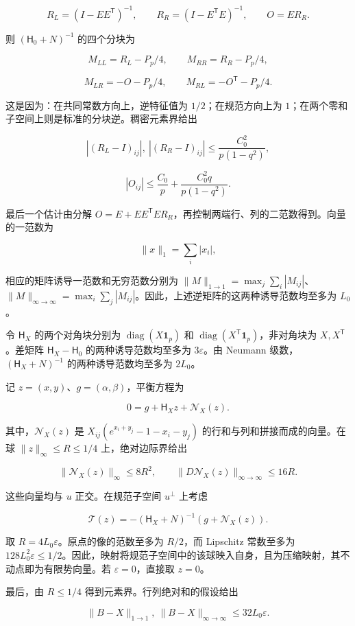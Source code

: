 \documentclass[11pt,a4paper]{article}
\begin{document}
\[
R_L=(I-EE^{\mathsf T})^{-1},\qquad R_R=(I-E^{\mathsf T}E)^{-1},\qquad O=ER_R.
\]

则 \((\mathsf H_0+N)^{-1}\) 的四个分块为

\[
M_{LL}=R_L-P_p/4,\qquad M_{RR}=R_R-P_p/4,
\]

\[
M_{LR}=-O-P_p/4,\qquad M_{RL}=-O^{\mathsf T}-P_p/4.
\]

这是因为：在共同常数方向上，逆特征值为 \(1/2\)；在规范方向上为 \(1\)；在两个零和子空间上则是标准的分块逆。稠密元素界给出

\[
|(R_L-I)_{ij}|,\ |(R_R-I)_{ij}|\le\frac{C_0^2}{p(1-q^2)},
\]

\[
|O_{ij}|\le\frac{C_0}{p}+\frac{C_0^2q}{p(1-q^2)}.
\]

最后一个估计由分解 \(O=E+EE^{\mathsf T}ER_R\)，再控制两端行、列的二范数得到。向量的一范数为

\[
\|x\|_1=\sum_i|x_i|,
\]

相应的矩阵诱导一范数和无穷范数分别为 \(\|M\|_{1\to1}=\max_j\sum_i|M_{ij}|\)、\(\|M\|_{\infty\to\infty}=\max_i\sum_j|M_{ij}|\)。因此，上述逆矩阵的这两种诱导范数均至多为 \(L_0\)。

令 \(\mathsf H_X\) 的两个对角块分别为 \(\operatorname{diag}(X\mathbf 1_p)\) 和 \(\operatorname{diag}(X^{\mathsf T}\mathbf 1_p)\)，非对角块为 \(X,X^{\mathsf T}\)。差矩阵 \(\mathsf H_X-\mathsf H_0\) 的两种诱导范数均至多为 \(3\varepsilon\)。由 Neumann 级数，\((\mathsf H_X+N)^{-1}\) 的两种诱导范数均至多为 \(2L_0\)。

记 \(z=(x,y)\)、\(g=(\alpha,\beta)\)，平衡方程为

\[
0=g+\mathsf H_Xz+\mathcal N_X(z).
\]

其中，\(\mathcal N_X(z)\) 是 \(X_{ij}(e^{x_i+y_j}-1-x_i-y_j)\) 的行和与列和拼接而成的向量。在球 \(\|z\|_\infty\le R\le1/4\) 上，绝对边际界给出

\[
\|\mathcal N_X(z)\|_\infty\le8R^2,\qquad \|D\mathcal N_X(z)\|_{\infty\to\infty}\le16R.
\]

这些向量均与 \(u\) 正交。在规范子空间 \(u^\perp\) 上考虑

\[
\mathcal T(z)=-(\mathsf H_X+N)^{-1}(g+\mathcal N_X(z)).
\]

取 \(R=4L_0\varepsilon\)。原点的像的范数至多为 \(R/2\)，而 Lipschitz 常数至多为 \(128L_0^2\varepsilon\le1/2\)。因此，映射将规范子空间中的该球映入自身，且为压缩映射，其不动点即为有限势向量。若 \(\varepsilon=0\)，直接取 \(z=0\)。

最后，由 \(R\le1/4\) 得到元素界。行列绝对和的假设给出

\[
\|B-X\|_{1\to1},\ \|B-X\|_{\infty\to\infty}\le32L_0\varepsilon.
\]
\end{document}
